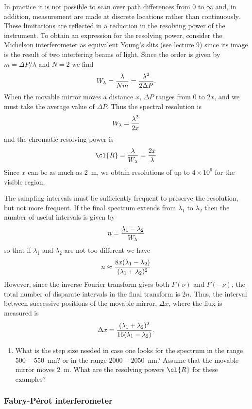 In practice it is not possible to scan over path differences from 0 to $\infty$ and, in 
addition, measurement are made at discrete locations rather than continuously. These
limitations are reflected in a reduction in the resolving power of the instrument. To obtain an expression for the resolving power, consider the Michelson interferometer as equivalent Young's slits (see lecture 9) since its image is the result of two interfering
beams of light. Since the order is given by $m=\Delta P/\lambda$ and $N=2$ we find
\[
W_\lambda={\lambda\over Nm}={\lambda^2\over 2\Delta P}.
\]
When the movable mirror moves a distance $x$, $\Delta P$ ranges from $0$ to $2x$, and we must take the average value of $\Delta P$. Thus the spectral resolution is
\[
W_\lambda={\lambda^2\over 2x}
\]
and the chromatic resolving power is 
\[
\cl{R}={\lambda\over W_\lambda}={2x\over\lambda}
\]
Since $x$ can be as much as 2~m, we obtain resolutions of up to $4\times 10^6$ for the
visible region. 

The sampling intervals must be sufficiently frequent to preserve the resolution, but not more frequent. If the final spectrum extends from $\lambda_1$ to $\lambda_2$ then the
number of useful intervals is given by 
\[
n={\lambda_1-\lambda_2\over W_\lambda}
\]
so that if $\lambda_1$ and $\lambda_2$ are not too different we have
\[
n\approx{8x(\lambda_1-\lambda_2)\over(\lambda_1+\lambda_2)^2}
\]
However, since the inverse Fourier transform gives both $F(\nu)$ and $F(-\nu)$, the total
number of disparate intervals in the final transform is $2n$. Thus, the interval between successive positions of the movable mirror, $\Delta x$, where the flux is measured is
\[
\Delta x={(\lambda_1+\lambda_2)^2\over 16(\lambda_1-\lambda_2)}.
\]


\begin{enumerate}
\setcounter{enumi}{\value{count}}
\item What is the step size needed in case one looks for the spectrum
  in the range $500-550$~nm? or in the range $2000-2050$~nm? Assume
  that the movable mirror moves 2~m. What are the resolving powers
  $\cl{R}$ for these examples?
\setcounter{count}{\value{enumi}}
\end{enumerate}


\subsubsection{Fabry-P\'erot interferometer}

